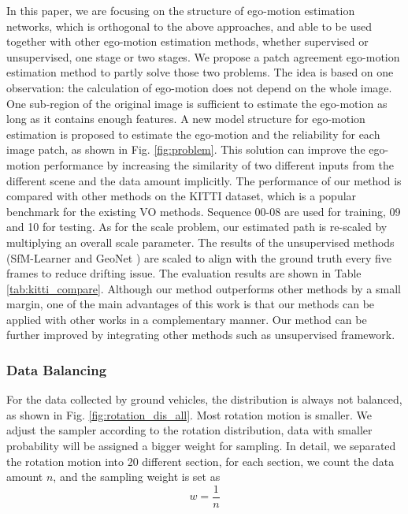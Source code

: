     In this paper, we are focusing on the structure of ego-motion estimation networks, which is orthogonal to the above approaches, and able to be used together with other ego-motion estimation methods, whether supervised or unsupervised, one stage or two stages. We propose a patch agreement ego-motion estimation method to partly solve those two problems. The idea is based on one observation: the calculation of ego-motion does not depend on the whole image. One sub-region of the original image is sufficient to estimate the ego-motion as long as it contains enough features. A new model structure for ego-motion estimation is proposed to estimate the ego-motion and the reliability for each image patch, as shown in Fig. \ref{fig:problem}. This solution can improve the ego-motion performance by increasing the similarity of two different inputs from the different scene and the data amount implicitly. 
    The performance of our method is compared with other methods on the
KITTI dataset, which is a popular benchmark for the existing VO methods. 
Sequence 00-08 are used for training, 09 and 10 for testing. As for the scale problem, 
our estimated path is re-scaled by multiplying an overall scale parameter. 
The results of the unsupervised methods (SfM-Learner
\cite{zhou2017unsupervised} and GeoNet \cite{yin2018geonet}) are scaled 
to align with the ground truth every five frames to reduce drifting issue.
The evaluation results are shown in Table \ref{tab:kitti_compare}. Although our method
outperforms other methods by a small margin, one of the main advantages of this
work is that our methods can be applied with other works in a complementary manner.
Our method can be further improved by integrating other methods such as unsupervised framework. 

\iffalse
\subsubsection{Data Balancing}

For the data collected by ground vehicles, the distribution is always not balanced, as shown in Fig. \ref{fig:rotation_dis_all}.
Most rotation motion is smaller. We adjust the sampler according to the rotation distribution, data with smaller probability
will be assigned a bigger weight for sampling. In detail, we separated the rotation motion into 20 different section,
for each section, we count the data amount $n$, and the sampling weight is set as 
$$w = \frac{1}{n}$$


